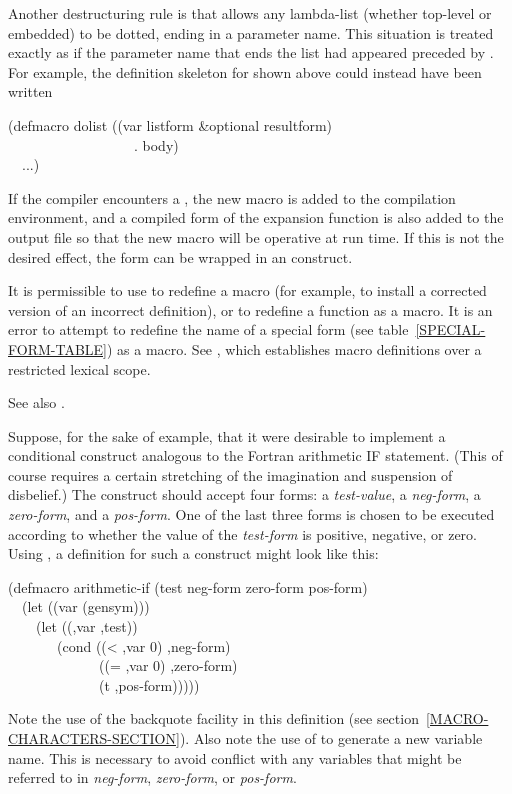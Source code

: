 \begin{defmac}
Another destructuring rule is that  allows any lambda-list
(whether top-level or embedded) to be dotted, ending
in a parameter name.  This situation is treated exactly as if the
parameter name that ends the list had appeared preceded by .
For example, the definition skeleton for  shown above could
instead have been written
\begin{lisp}
(defmacro dolist ((var listform \&optional resultform) \\
~~~~~~~~~~~~~~~~~~. body) \\
~~...)
\end{lisp}

If the compiler encounters a ,
the new macro is added to the compilation
environment, and a compiled form of the expansion function is also added
to the output file so that the new macro will be operative at run time.
If this is not the desired effect, the  form can be wrapped
in an  construct.

It is permissible to use  to redefine a macro
(for example, to install
a corrected version of an incorrect definition), or to redefine
a function as a macro.
It is an error to attempt to redefine the name of a special
form (see table~\ref{SPECIAL-FORM-TABLE}) as a macro.
See , which establishes macro
definitions over a restricted lexical scope.

\begin{newer}
See also .
\end{newer}

Suppose, for the sake of example, that it were desirable
to implement a conditional construct analogous to the
Fortran arithmetic IF statement.  (This of course requires a certain
stretching of the imagination and suspension of disbelief.)
The construct should accept four forms: a \emph{test-value},
a \emph{neg-form}, a \emph{zero-form}, and a \emph{pos-form}.
One of the last three forms is chosen to be executed according
to whether the value of the \emph{test-form} is positive, negative,
or zero.
Using , a definition for such a construct
might look like this:
\begin{lisp}
(defmacro arithmetic-if (test neg-form zero-form pos-form) \\
~~(let ((var (gensym))) \\
~~~~{\Xbq}(let ((,var ,test)) \\
~~~~~~~(cond ((< ,var 0) ,neg-form) \\
~~~~~~~~~~~~~((= ,var 0) ,zero-form) \\
~~~~~~~~~~~~~(t ,pos-form)))))
\end{lisp}
Note the use of the backquote facility in this definition
(see section~\ref{MACRO-CHARACTERS-SECTION}).
Also note the use of  to generate a new variable name.
This is necessary to avoid conflict with any variables that might
be referred to in \emph{neg-form}, \emph{zero-form}, or \emph{pos-form}.


\end{defmac}
